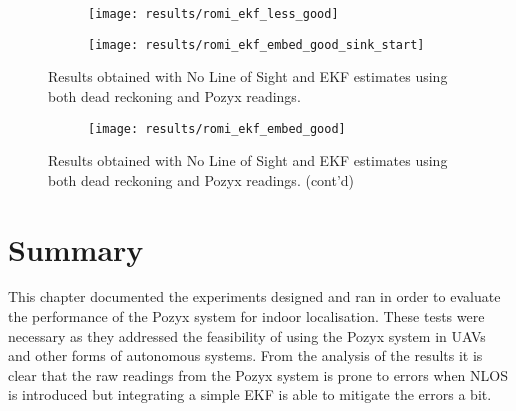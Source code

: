 \begin{figure}[ht!]
    \centering
    \begin{subfigure}{0.7\textwidth}
            \texttt{[image: results/romi\_ekf\_less\_good]}
    \end{subfigure}
    \begin{subfigure}{0.7\textwidth}
            \texttt{[image: results/romi\_ekf\_embed\_good\_sink\_start]}
    \end{subfigure}
    \caption{Results obtained with No Line of Sight and EKF estimates using both dead reckoning and Pozyx readings.}
    \label{fig:romi_nlos_ekf}
\end{figure}
\begin{figure}[ht!]\ContinuedFloat
    \centering
    \begin{subfigure}{0.7\textwidth}
            \texttt{[image: results/romi\_ekf\_embed\_good]}
    \end{subfigure}
    \caption[]{Results obtained with No Line of Sight and EKF estimates using both dead reckoning and Pozyx readings. (cont'd)}
\end{figure}
\newpage



\section{Summary}
This chapter documented the experiments designed and ran in order to evaluate the performance of the Pozyx system for indoor localisation.
These tests were necessary as they addressed the feasibility of using the Pozyx system in UAVs and other forms of autonomous systems.
From the analysis of the results it is clear that the raw readings from the Pozyx system is prone to errors when NLOS is introduced but integrating a simple EKF is able to mitigate the errors a bit.

